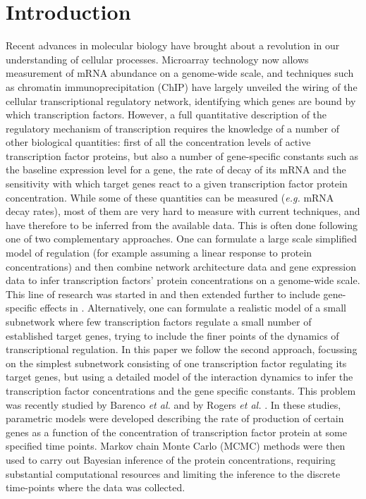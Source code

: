 \documentclass[english]{article}
\begin{document}
\section*{Introduction}
Recent advances in molecular biology  have brought about a revolution in our
understanding of cellular processes. Microarray technology now allows 
measurement of mRNA abundance on a genome-wide scale, and techniques such as
chromatin immunoprecipitation (ChIP) have largely
unveiled the wiring of the cellular transcriptional regulatory network, 
identifying which genes are bound by which transcription factors.
However, a full quantitative description of the regulatory mechanism of
transcription requires the knowledge of a number of other biological 
quantities: first of all the concentration levels of active 
transcription factor proteins, but also a number of gene-specific constants 
such as the baseline expression level for a gene, the rate of decay of its
mRNA and the sensitivity with which target genes
react to a given transcription factor protein concentration. While some
of these quantities can be measured (\emph{e.g.} mRNA decay rates), 
most of them are very hard to measure with current techniques, and have 
therefore to be inferred from the available data.
This
is often done following one of two complementary approaches. One can formulate
a large scale simplified model of regulation (for example assuming a linear
response to protein concentrations) and then combine network architecture data
and gene expression data to infer
transcription factors' protein concentrations on a genome-wide scale. This
line of research was started in \cite{Liao:nca03} 
and then extended further to include gene-specific effects in 
\cite{Sabatti06,Sanguinetti:chipdyno06}. 
Alternatively, one can formulate a realistic model of a 
small subnetwork where few
transcription factors regulate a small number of established target genes, 
trying to include the finer points of the dynamics of transcriptional 
regulation. 
In this paper we follow the second approach, focussing on the simplest 
subnetwork consisting of
one transcription factor regulating its target genes, but using a 
detailed model of the interaction dynamics to infer the transcription factor 
concentrations and the gene specific constants. 
This problem was recently studied
by Barenco \emph{et al.} \cite{Barenco:ranked06} and by Rogers \emph{et al.}
\cite{Rogers:model06b}. 
In these studies, parametric models were developed describing 
the rate of production of certain
genes as a function of the concentration of transcription factor protein at
some specified time points. Markov chain Monte
Carlo (MCMC) methods were then used to carry out Bayesian inference of the protein 
concentrations,
requiring substantial computational resources and limiting the
inference to the discrete time-points where the data was collected.  
\end{document}
